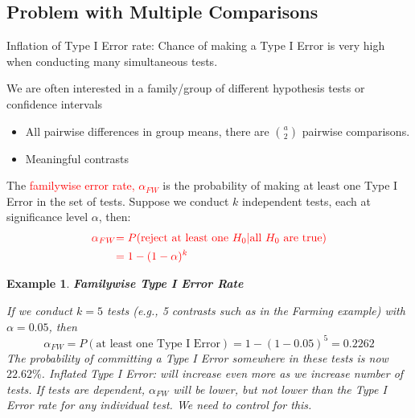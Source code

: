 \documentclass[a4paper,11pt]{article}
\newtheorem{eg}[thm]{Example}
\begin{document}
\subsection{Problem with Multiple Comparisons}
Inflation of Type I Error rate: Chance of making a Type I Error is very high when conducting many simultaneous tests. 

We are often interested in a family/group of different hypothesis tests or confidence intervals
\begin{itemize}
\item All pairwise differences in group means, there are ${a\choose 2}$ pairwise comparisons.
\item Meaningful contrasts
\end{itemize}
The \textcolor{red}{familywise error rate, $\alpha_{FW}$} is the probability of making at least one Type I Error in the set of tests. Suppose we conduct $k$ independent tests, each at significance level $\alpha$, then: 
\begin{align*}
\textcolor{red}{\alpha_{FW}}&\textcolor{red}{=P(\text{reject at least one $H_0|$all $H_0$ are true})}\\
&\textcolor{red}{=1-(1-\alpha)^k}
\end{align*}
\begin{eg}
\normalfont
\textbf{Familywise Type I Error Rate}

If we conduct $k=5$ tests (e.g., 5 contrasts such as in the Farming example) with $\alpha=0.05$, then
$$\alpha_{FW}=P(\text{at least one Type I Error})=1-(1-0.05)^5=0.2262$$
The probability of committing a Type I Error somewhere in these tests is now $22.62\%$. Inflated Type I Error: will increase even more as we increase number of tests. If tests are dependent, $\alpha_{FW}$ will be lower, but not lower than the Type I Error rate for any individual test. We need to control for this. 
\end{eg}
\end{document}
